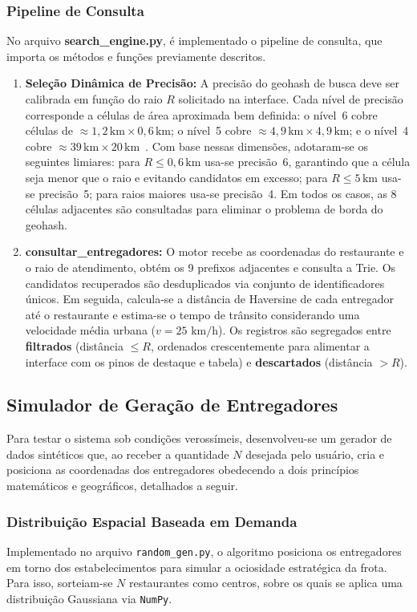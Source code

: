 \documentclass[12pt,a4paper]{article}
\begin{document}
  \subsubsection{Pipeline de Consulta}
  No arquivo \textbf{search\_engine.py}, é implementado o pipeline de consulta, que importa os métodos e funções previamente descritos.
  \begin{enumerate}
    \item \textbf{Seleção Dinâmica de Precisão:} A precisão do geohash de busca deve ser calibrada em função do raio $R$ solicitado na interface.
      Cada nível de precisão corresponde a células de área aproximada bem definida: o nível~6 cobre células de
      $\approx 1{,}2\,\text{km} \times 0{,}6\,\text{km}$; o nível~5 cobre
      $\approx 4{,}9\,\text{km} \times 4{,}9\,\text{km}$; e o nível~4 cobre
      $\approx 39\,\text{km} \times 20\,\text{km}$~. Com base nessas
      dimensões, adotaram-se os seguintes limiares: para $R \le 0{,}6\,\text{km}$
      usa-se precisão~6, garantindo que a célula seja menor que o raio e evitando
      candidatos em excesso; para $R \le 5\,\text{km}$ usa-se precisão~5; para
      raios maiores usa-se precisão~4.
      Em todos os casos, as 8 células adjacentes são consultadas para eliminar o problema de borda do geohash.
    \item \textbf{consultar\_entregadores:} O motor recebe as coordenadas do restaurante e o raio de atendimento, obtém os 9 prefixos adjacentes e consulta a Trie.
      Os candidatos recuperados são desduplicados via conjunto de identificadores únicos. Em seguida, calcula-se a distância de Haversine de cada entregador até o
      restaurante e estima-se o tempo de trânsito considerando uma velocidade média urbana ($v = 25\text{ km/h}$). Os registros são segregados entre \textbf{filtrados}
      (distância $\le R$, ordenados crescentemente para alimentar a interface com os pinos de destaque e tabela) e \textbf{descartados} (distância $> R$).
  \end{enumerate}
\subsection{Simulador de Geração de Entregadores}
Para testar o sistema sob condições verossímeis, desenvolveu-se um gerador de dados sintéticos que, ao receber a quantidade $N$ desejada pelo usuário, cria e posiciona as coordenadas dos entregadores obedecendo a dois princípios matemáticos e geográficos, detalhados a seguir.

\subsubsection{Distribuição Espacial Baseada em Demanda}
Implementado no arquivo \texttt{random\_gen.py}, o algoritmo posiciona os entregadores em torno dos estabelecimentos para simular a ociosidade estratégica da frota. Para isso, sorteiam-se $N$ restaurantes como centros, sobre os quais se aplica uma distribuição Gaussiana via \texttt{NumPy}. 
\end{document}
